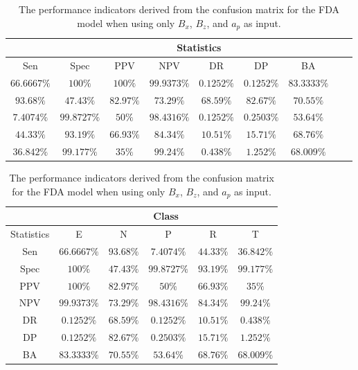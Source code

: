 \begin{table}[!ht]
	\centering
	\begin{tabular}{|c|c|c|c|c|c|c|c|c|}
		\hline
		 & \multicolumn{7}{c|}{Statistics} \\ \hline
		Sen & Spec & PPV & NPV & DR & DP & BA \\ \hline
		$66.6667\%$ & $100\%$ & $100\%$ & $99.9373\%$ & $0.1252\%$ & $0.1252\%$ & $83.3333\%$ \\ \hline
		$93.68\%$ & $47.43\%$ & $82.97\%$ & $73.29\%$ & $68.59\%$ & $82.67\%$ & $70.55\%$ \\ \hline
		$7.4074\%$ & $99.8727\%$ & $50\%$ & $98.4316\%$ & $0.1252\%$ & $0.2503\%$ & $53.64\%$ \\ \hline
		$44.33\%$ & $93.19\%$ & $66.93\%$ & $84.34\%$ & $10.51\%$ & $15.71\%$ & $68.76\%$ \\ \hline
		$36.842\%$ & $99.177\%$ & $35\%$ & $99.24\%$ & $0.438\%$ & $1.252\%$ & $68.009\%$ \\ \hline
	\end{tabular}
	\caption{The performance indicators derived from the confusion matrix for the FDA model when using only $B_{x}$, $B_{z}$, and $a_{p}$ as input.}
	\label{tab:cs:xzap:fda}
\end{table}

\begin{table}[!ht]
	\centering
	\begin{tabular}{|c|c|c|c|c|c|}
		\hline
		 & \multicolumn{5}{c|}{Class} \\ \hline
		Statistics & E & N & P & R & T \\ \hline
		Sen & $66.6667\%$ & $93.68\%$ & $7.4074\%$ & $44.33\%$ & $36.842\%$ \\ \hline
		Spec & $100\%$ & $47.43\%$ & $99.8727\%$ & $93.19\%$ & $99.177\%$ \\ \hline
		PPV & $100\%$ & $82.97\%$ & $50\%$ & $66.93\%$ & $35\%$ \\ \hline
		NPV & $99.9373\%$ & $73.29\%$ & $98.4316\%$ & $84.34\%$ & $99.24\%$ \\ \hline
		DR & $0.1252\%$ & $68.59\%$ & $0.1252\%$ & $10.51\%$ & $0.438\%$ \\ \hline
		DP & $0.1252\%$ & $82.67\%$ & $0.2503\%$ & $15.71\%$ & $1.252\%$ \\ \hline
		BA & $83.3333\%$ & $70.55\%$ & $53.64\%$ & $68.76\%$ & $68.009\%$ \\ \hline
	\end{tabular}
	\caption{The performance indicators derived from the confusion matrix for the FDA model when using only $B_{x}$, $B_{z}$, and $a_{p}$ as input.}
	\label{tab:cs:reverse:xzap:fda}
\end{table}


